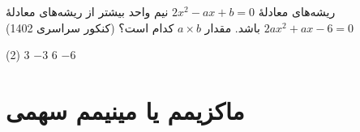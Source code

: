 \begin{example}
ریشه‌های معادلۀ
$2x^2-ax+b=0$
نیم واحد بیشتر از ریشه‌های معادلۀ
$2ax^2+ax-6=0$
باشد. مقدار $a\times b$ کدام است؟
\hfill
{\small\color{MPSecondary}(کنکور سراسری 1402)}

\begin{tasks}(2)
    \task $3$
    \task $-3$
    \task $6$
    \task $-6$
\end{tasks}
\end{example}


\section{ماکزیمم یا مینیمم سهمی}

